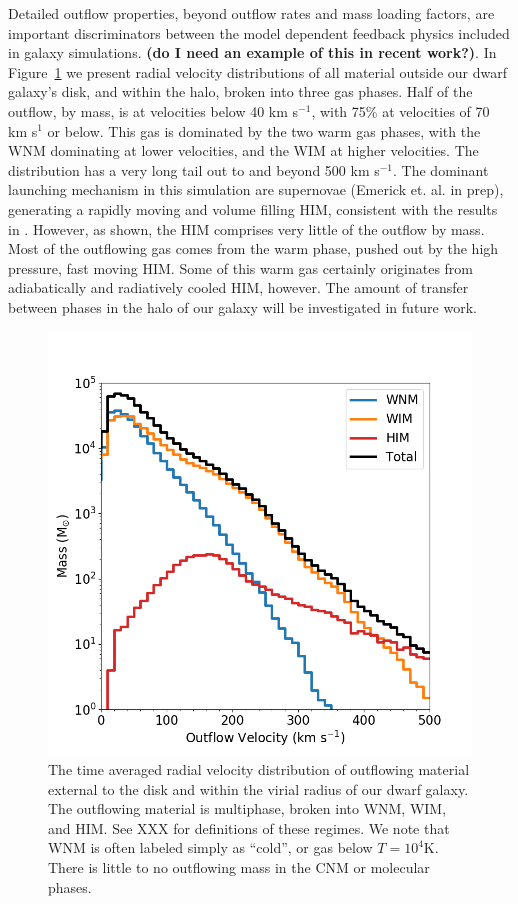 \documentclass[twocolumn]{aastex61}
\begin{document}
Detailed outflow properties, beyond outflow rates and mass loading factors, are important discriminators between the model dependent feedback physics included in galaxy simulations. \textbf{(do I need an example of this in recent work?)}. In Figure~\ref{fig:outflow_velocity} we present radial velocity distributions of all material outside our dwarf galaxy's disk, and within the halo, broken into three gas phases. Half of the outflow, by mass, is at velocities below 40 km s$^{-1}$, with 75\% at velocities of 70 km s$^{1}$ or below. This gas is dominated by the two warm gas phases, with the WNM dominating at lower velocities, and the WIM at higher velocities. The distribution has a very long tail out to and beyond 500 km s$^{-1}$. The dominant launching mechanism in this simulation are supernovae (Emerick et. al. in prep), generating a rapidly moving and volume filling HIM, consistent with the results in \citet{Hu2016,Hu2017}. However, as shown, the HIM comprises very little of the outflow by mass. Most of the outflowing gas comes from the warm phase, pushed out by the high pressure, fast moving HIM. Some of this warm gas certainly originates from adiabatically and radiatively cooled HIM, however. The amount of transfer between phases in the halo of our galaxy will be investigated in future work.

\begin{figure}
\centering
\includegraphics[width=0.95\linewidth]{outflow_velocity_distribution}
\caption{The time averaged radial velocity distribution of outflowing material external to the disk and within the virial radius of our dwarf galaxy. The outflowing material is multiphase, broken into WNM, WIM, and HIM. See XXX for definitions of these regimes. We note that WNM is often labeled simply as ``cold'', or gas below $T = 10^{4}$K. There is little to no outflowing mass in the CNM or molecular phases.}
\label{fig:outflow_velocity}
\end{figure}
\end{document}
